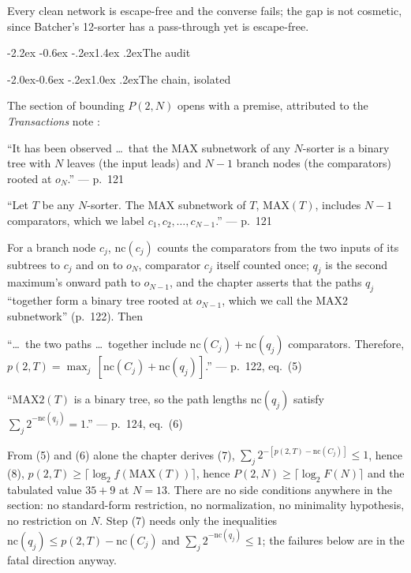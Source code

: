 \documentclass[11pt,a4paper]{article}
\makeatletter
\renewenvironment{quote}{\begin{oldquote}\small}{\end{oldquote}}
\renewcommand\section{\@startsection{section}{1}{\z@}%
  {-2.2ex \@plus -0.6ex \@minus -.2ex}{1.4ex \@plus.2ex}{\normalfont\large\bfseries}}
\renewcommand\subsection{\@startsection{subsection}{2}{\z@}%
  {-2.0ex\@plus -0.6ex \@minus -.2ex}{1.0ex \@plus .2ex}{\normalfont\normalsize\bfseries}}
\newcommand{\MAX}{\mathrm{MAX}}
\newcommand{\MAXTWO}{\mathrm{MAX2}}
\newcommand{\nc}{\mathrm{nc}}
\makeatother
\begin{document}
Every clean network is escape-free and the converse fails; the gap is not
cosmetic, since Batcher's 12-sorter \cite{Ba68} has a pass-through yet is
escape-free.

\section{The audit}
\label{sec:audit}

\subsection{The chain, isolated}

The section of \cite{VV72} bounding $P(2,N)$ opens with a premise, attributed to
the \emph{Transactions} note \cite{VV72a}:

\begin{quote}
``It has been observed \dots\ that the MAX subnetwork of any $N$-sorter is a
binary tree with $N$ leaves (the input leads) and $N-1$ branch nodes (the
comparators) rooted at $o_N$.'' \hfill --- p.~121

``Let $T$ be any $N$-sorter. The MAX subnetwork of $T$, $\MAX(T)$, includes
$N-1$ comparators, which we label $c_1, c_2, \dots, c_{N-1}$.''
\hfill --- p.~121
\end{quote}

\noindent
For a branch node $c_j$, $\nc(c_j)$ counts the comparators from the two inputs
of its subtrees to $c_j$ and on to $o_N$, comparator $c_j$ itself counted once;
$q_j$ is the second maximum's onward path to $o_{N-1}$, and the chapter asserts
that the paths $q_j$ ``together form a binary tree rooted at $o_{N-1}$, which we
call the MAX2 subnetwork'' (p.~122). Then

\begin{quote}
``\dots\ the two paths \dots\ together include $\nc(C_j) + \nc(q_j)$
comparators. Therefore, $p(2,T) = \max_j\,[\nc(C_j) + \nc(q_j)]$.''
\hfill --- p.~122, eq.~(5)

``$\MAXTWO(T)$ is a binary tree, so the path lengths $\nc(q_j)$ satisfy
$\sum_j 2^{-\nc(q_j)} = 1$.'' \hfill --- p.~124, eq.~(6)
\end{quote}

\noindent
From (5) and (6) alone the chapter derives (7),
$\sum_j 2^{-[p(2,T)-\nc(C_j)]} \le 1$, hence (8),
$p(2,T) \ge \lceil \log_2 f(\MAX(T))\rceil$, hence
$P(2,N) \ge \lceil \log_2 F(N)\rceil$ and the tabulated value $35+9$ at $N=13$.
There are no side conditions anywhere in the section: no standard-form
restriction, no normalization, no minimality hypothesis, no restriction on $N$.
Step (7) needs only the inequalities $\nc(q_j) \le p(2,T) - \nc(C_j)$ and
$\sum_j 2^{-\nc(q_j)} \le 1$; the failures below are in the fatal direction
anyway.
\end{document}
